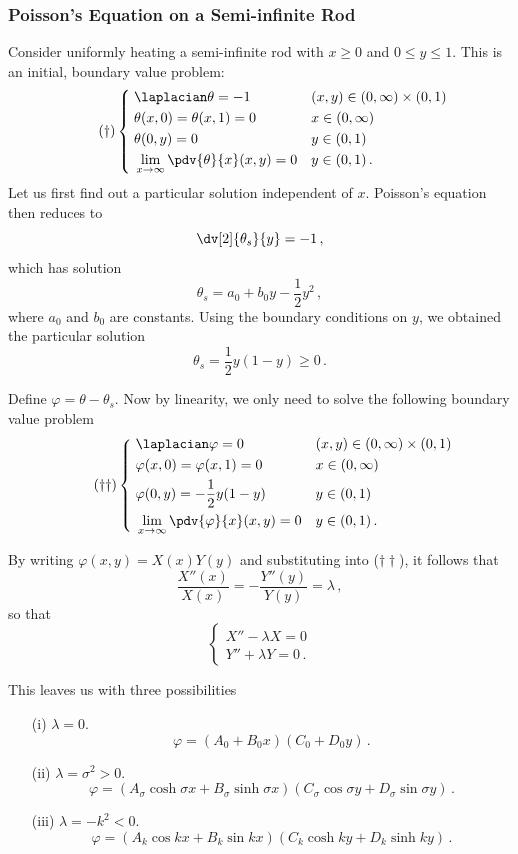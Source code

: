 \documentclass{article}
\theoremstyle{plain}\theoremheaderfont{\normalfont\itshape}\theorembodyfont{\rmfamily}\theoremseparator{.}\newtheorem*{rem}{Remark}\newtheorem*{ex}{Example}\newtheorem*{proof}{Proof}\newtheorem*{altp}{Alternative proof}
\theoremstyle{plain}\theoremheaderfont{\normalfont\bfseries}\theorembodyfont{\rmfamily}\theoremseparator{.}\newtheorem{thm}{Theorem}[section]\newtheorem{lem}[thm]{Lemma}\newtheorem{prop}[thm]{Proposition}\newtheorem*{cor}{Corollary}\newtheorem{defn}[thm]{Definition}\newtheorem{clm}[thm]{Claim}\newtheorem{clminproof}{Claim}
\theoremstyle{break}\theoremheaderfont{\normalfont\itshape}\theorembodyfont{\rmfamily}\theoremseparator{.\medskip}\newtheorem*{proofskip}{Proof}\newtheorem*{exs}{Examples}\newtheorem*{rems}{Remarks}
\theoremstyle{break}\theoremheaderfont{\normalfont\bfseries}\theorembodyfont{\rmfamily}\theoremseparator{.\medskip}\newtheorem{lemskip}[thm]{Lemma}\newtheorem{defnskip}[thm]{Definition}\newtheorem{propskip}[thm]{Proposition}\newtheorem{thmskip}[thm]{Theorem}
\numberwithin{equation}{section}
\begin{document}
	\subsubsection{Poisson's Equation on a Semi-infinite Rod}
	Consider uniformly heating a semi-infinite rod with \(x\ge 0\) and \(0\le y\le 1\). This is an initial, boundary value problem:
	\begin{equation}\tag{\(\dagger\)}
		\left\{\begin{aligned}
			& \;\laplacian\theta=-1 && (x,y)\in(0,\infty)\times(0,1)\\
			& \;\theta(x,0)=\theta(x,1)=0 && x\in(0,\infty)\\
			& \;\theta(0,y)=0 && y\in(0,1)\\
			& \;\lim_{x\to\infty}\pdv{\theta}{x}(x,y)=0 && y\in(0,1)\,.
		\end{aligned}\right.
	\end{equation}
	Let us first find out a particular solution independent of \(x\). Poisson's equation then reduces to
	\[\dv[2]{\theta_s}{y}=-1\,,\]
	which has solution
	\[\theta_s=a_0+b_0y-\frac{1}{2}y^2\,,\]
	where \(a_0\) and \(b_0\) are constants. Using the boundary conditions on \(y\), we obtained the particular solution
	\[\theta_s=\frac{1}{2}y(1-y)\ge 0\,.\]

	Define \(\varphi=\theta-\theta_s\). Now by linearity, we only need to solve the following boundary value problem
	\begin{equation}\tag{\(\dagger\dagger\)}
		\left\{\begin{aligned}
			& \;\laplacian\varphi=0 && (x,y)\in(0,\infty)\times(0,1)\\
			& \;\varphi(x,0)=\varphi(x,1)=0 && x\in(0,\infty)\\
			& \;\varphi(0,y)=-\frac{1}{2}y(1-y) && y\in(0,1)\\
			& \;\lim_{x\to\infty}\pdv{\varphi}{x}(x,y)=0 && y\in(0,1)\,.
		\end{aligned}\right.
	\end{equation}

	By writing \(\varphi(x,y)=X(x)Y(y)\) and substituting into (\(\dagger\dagger\)), it follows that
	\[\frac{X''(x)}{X(x)}=-\frac{Y''(y)}{Y(y)}=\lambda\,,\]
	so that
	\[\begin{cases}
		X''-\lambda X=0\\
		Y''+\lambda Y=0\,.
	\end{cases}\]
	
	This leaves us with three possibilities
	\begin{enumerate}[topsep=0pt]
		\item[(i)] \(\lambda=0\).
		\[\varphi=(A_0+B_0 x)(C_0+D_0 y)\,.\]
		\item[(ii)] \(\lambda=\sigma^2>0\).
		\[\varphi=(A_\sigma\cosh\sigma x+B_\sigma\sinh\sigma x)(C_\sigma\cos\sigma y+D_\sigma\sin\sigma y)\,.\]
		\item[(iii)] \(\lambda=-k^2<0\).
		\[\varphi=(A_k\cos kx+B_k\sin kx)(C_k\cosh ky+D_k\sinh ky)\,.\]
	\end{enumerate}
	
\end{document}
